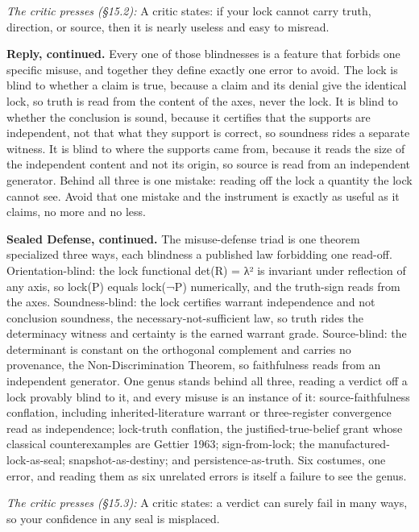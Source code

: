 \documentclass[10pt,twocolumn]{article}
\begin{document}
\emph{The critic presses (§15.2):} A critic states: if your lock cannot
carry truth, direction, or source, then it is nearly useless and easy to
misread.

\textbf{Reply, continued.} Every one of those blindnesses is a feature
that forbids one specific misuse, and together they define exactly one
error to avoid. The lock is blind to whether a claim is true, because a
claim and its denial give the identical lock, so truth is read from the
content of the axes, never the lock. It is blind to whether the
conclusion is sound, because it certifies that the supports are
independent, not that what they support is correct, so soundness rides a
separate witness. It is blind to where the supports came from, because
it reads the size of the independent content and not its origin, so
source is read from an independent generator. Behind all three is one
mistake: reading off the lock a quantity the lock cannot see. Avoid that
one mistake and the instrument is exactly as useful as it claims, no
more and no less.

\textbf{Sealed Defense, continued.} The misuse-defense triad is one
theorem specialized three ways, each blindness a published law
forbidding one read-off. Orientation-blind: the lock functional det(R) =
λ² is invariant under reflection of any axis, so lock(P) equals lock(¬P)
numerically, and the truth-sign reads from the axes. Soundness-blind:
the lock certifies warrant independence and not conclusion soundness,
the necessary-not-sufficient law, so truth rides the determinacy witness
and certainty is the earned warrant grade. Source-blind: the determinant
is constant on the orthogonal complement and carries no provenance, the
Non-Discrimination Theorem, so faithfulness reads from an independent
generator. One genus stands behind all three, reading a verdict off a
lock provably blind to it, and every misuse is an instance of it:
source-faithfulness conflation, including inherited-literature warrant
or three-register convergence read as independence; lock-truth
conflation, the justified-true-belief grant whose classical
counterexamples are Gettier 1963; sign-from-lock; the
manufactured-lock-as-seal; snapshot-as-destiny; and
persistence-as-truth. Six costumes, one error, and reading them as six
unrelated errors is itself a failure to see the genus.

\emph{The critic presses (§15.3):} A critic states: a verdict can surely
fail in many ways, so your confidence in any seal is misplaced.
\end{document}
